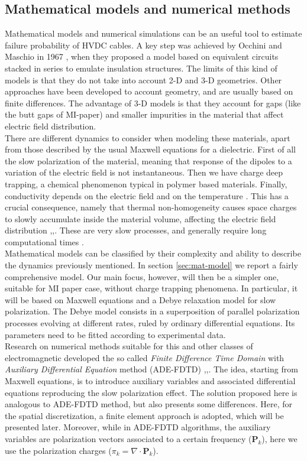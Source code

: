 \documentclass[11pt,a4paper]{article}
\begin{document}
\subsection{Mathematical models and numerical methods}\label{sec:mmnm}
Mathematical models and numerical simulations can be an useful tool to estimate failure probability of HVDC cables. A key step was achieved by Occhini and Maschio in 1967 \cite{4073280}, when they proposed a model based on equivalent circuits stacked in series to emulate insulation structures. The limits of this kind of models is that they do not take into account 2-D and 3-D geometries. Other approaches have been developed to account geometry, and are usually based on finite differences. The advantage of 3-D models is that they account for gaps (like the butt gaps of MI-paper) and smaller impurities in the material that affect electric field distribution.\\
There are different dynamics to consider when modeling these materials, apart from those described by the usual Maxwell equations for a dielectric. First of all the slow polarization of the material, meaning that response of the dipoles to a variation of the electric field is not instantaneous. Then we have charge deep trapping, a chemical phenomenon typical in polymer based materials. Finally, conductivity depends on the electric field and on the temperature \cite{time-dep-layered}. This has a crucial consequence, namely that thermal non-homogeneity causes space charges to slowly accumulate inside the material volume, affecting the electric field distribution \cite{en13195189},\cite{8939463},\cite{grading-techniques}. These are very slow processes, and generally require long computational times \cite{https://doi.org/10.1002/jnm.2713}.\\
Mathematical models can be classified by their complexity and ability to describe the dynamics previously mentioned. In section \ref{sec:mat-model} we report a fairly comprehensive model. Our main focus, however, will then be a simpler one, suitable for MI paper case, without charge trapping phenomena. In particular, it will be based on Maxwell equations and a Debye relaxation model for slow polarization. The Debye model consists in a superposition of parallel polarization processes evolving at different rates, ruled by ordinary differential equations. Its parameters need to be fitted according to experimental data.\\
Research on numerical methods suitable for this and other classes of electromagnetic developed the so called \textit{Finite Difference Time Domain} with \textit{Auxiliary Differential Equation} method (ADE-FDTD) \cite{taflove},\cite{ADE-FDTD-thesis},\cite{ADE-FDTD-art}. The idea, starting from Maxwell equations, is to introduce auxiliary variables and associated differential equations reproducing the slow polarization effect. The solution proposed here is analogous to ADE-FDTD method, but also presents some differences. Here, for the spatial discretization, a finite element approach is adopted, which will be presented later. Moreover, while in ADE-FDTD algorithms, the auxiliary variables are polarization vectors associated to a certain frequency (\(\mathbf{P}_k\)), here we use the polarization charges (\(\pi_k=\nabla \cdot\mathbf{P}_k\)).
\end{document}
